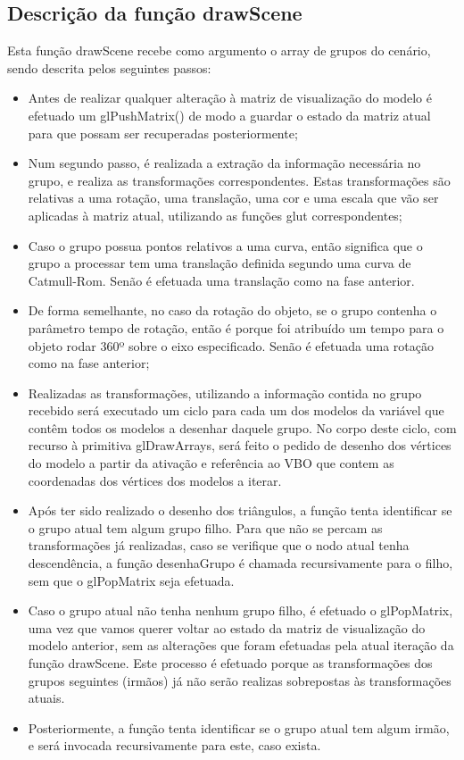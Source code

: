 \documentclass[12pt]{article}
\begin{document}
\subsection{Descrição da função drawScene}
Esta função drawScene recebe como argumento o array de grupos do cenário, sendo descrita pelos seguintes passos:
\begin{itemize}
\item Antes de realizar qualquer alteração à matriz de visualização do modelo é efetuado um
glPushMatrix() de modo a guardar o estado da matriz atual para que possam ser
recuperadas posteriormente;
\item Num segundo passo, é realizada a extração da informação necessária no grupo, e realiza as transformações correspondentes.
Estas transformações são relativas a uma rotação, uma translação, uma cor e uma escala
que vão ser aplicadas à matriz atual, utilizando as funções glut correspondentes;
\item Caso o grupo possua pontos relativos a uma curva, então significa que o grupo a
processar tem uma translação definida segundo uma curva de Catmull-Rom.
Senão é efetuada uma translação como na fase anterior.
\item De forma semelhante, no caso da rotação do objeto, se o grupo contenha
o parâmetro tempo de rotação, então é porque foi
atribuído um tempo para o objeto rodar 360º sobre o eixo especificado. Senão é efetuada
uma rotação como na fase anterior;
\item Realizadas as transformações, utilizando a informação contida no grupo recebido 
será executado um ciclo para cada um dos modelos da variável que contêm todos
os modelos a desenhar daquele grupo. No corpo deste ciclo, com recurso à primitiva
glDrawArrays, será feito o pedido de desenho dos vértices do modelo a partir da ativação
e referência ao VBO que contem as coordenadas dos vértices dos modelos a iterar.
\item Após ter sido realizado o desenho dos triângulos, a função tenta identificar se o grupo
atual tem algum grupo filho. Para que não se percam as transformações já
realizadas, caso se verifique que o nodo atual tenha descendência, a função
desenhaGrupo é chamada recursivamente para o filho, sem que o glPopMatrix seja
efetuada.
\item Caso o grupo atual não tenha nenhum grupo filho, é efetuado o glPopMatrix, uma vez
que vamos querer voltar ao estado da matriz de visualização do modelo anterior, sem as
alterações que foram efetuadas pela atual iteração da função drawScene.
Este processo é efetuado porque as transformações dos grupos seguintes (irmãos) já não
serão realizas sobrepostas às transformações atuais.
\item Posteriormente, a função tenta identificar se o
grupo atual tem algum irmão, e será invocada recursivamente para este, caso exista.
\end{itemize}
\end{document}
